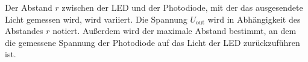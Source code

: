 Der Abstand $r$ zwischen der LED und der Photodiode, mit der das ausgesendete Licht gemessen wird, wird variiert.
Die Spannung $U_\text{out}$ wird in Abhängigkeit des Abstandes $r$ notiert.
Außerdem wird der maximale Abstand bestimmt, an dem die gemessene Spannung der Photodiode auf das Licht der LED zurückzuführen ist.